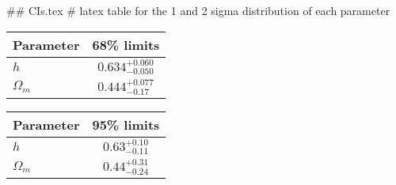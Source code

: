## CIs.tex
# latex table for the 1 and 2 sigma distribution of each parameter

\begin{tabular} { l  c}
 Parameter &  68\% limits\\
\hline
{\boldmath$h              $} & $0.634^{+0.060}_{-0.050}   $\\
{\boldmath$\Omega_m       $} & $0.444^{+0.077}_{-0.17}    $\\
\hline
\end{tabular}

\begin{tabular} { l  c}
 Parameter &  95\% limits\\
\hline
{\boldmath$h              $} & $0.63^{+0.10}_{-0.11}      $\\
{\boldmath$\Omega_m       $} & $0.44^{+0.31}_{-0.24}      $\\
\hline
\end{tabular}

